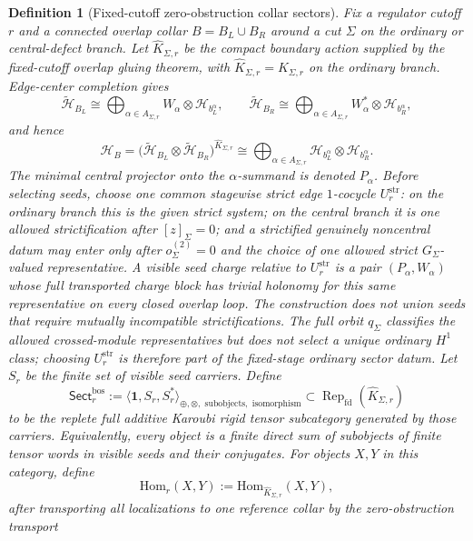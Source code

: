 \documentclass[11pt]{article}
\newtheorem{definition}[theorem]{Definition}
\begin{document}
\begin{definition}[Fixed-cutoff zero-obstruction collar sectors]\label{def:fixed-cutoff-collar-sectors}
Fix a regulator cutoff \(r\) and a connected overlap collar \(B=B_L\cup B_R\) around a cut
\(\Sigma\) on the ordinary or central-defect branch. Let \(\widehat K_{\Sigma,r}\) be the compact
boundary action supplied by the fixed-cutoff overlap gluing theorem, with
\(\widehat K_{\Sigma,r}=K_{\Sigma,r}\) on the ordinary branch. Edge-center completion gives
\[
\widetilde{\mathcal H}_{B_L}
\cong
\bigoplus_{\alpha\in A_{\Sigma,r}}
W_\alpha\otimes \mathcal H_{b_L^\alpha},
\qquad
\widetilde{\mathcal H}_{B_R}
\cong
\bigoplus_{\alpha\in A_{\Sigma,r}}
W_\alpha^*\otimes \mathcal H_{b_R^\alpha},
\]
and hence
\[
\mathcal H_B
=
\bigl(\widetilde{\mathcal H}_{B_L}\otimes\widetilde{\mathcal H}_{B_R}\bigr)^{\widehat K_{\Sigma,r}}
\cong
\bigoplus_{\alpha\in A_{\Sigma,r}}
\mathcal H_{b_L^\alpha}\otimes \mathcal H_{b_R^\alpha}.
\]
The minimal central projector onto the \(\alpha\)-summand is denoted \(P_\alpha\). Before selecting
seeds, choose one common stagewise strict edge \(1\)-cocycle
\(U^{\mathrm{str}}_r\): on the ordinary branch this is the given strict system; on the central
branch it is one allowed strictification after \([z]_\Sigma=0\); and a strictified genuinely
noncentral datum may enter only after \(o^{(2)}_\Sigma=0\) and the choice of one allowed strict
\(G_\Sigma\)-valued representative. A \emph{visible seed charge relative to
\(U^{\mathrm{str}}_r\)} is a pair \((P_\alpha,W_\alpha)\) whose full transported charge block has
trivial holonomy for this same representative on every closed overlap loop. The construction does
not union seeds that require mutually incompatible strictifications. The full orbit \(q_\Sigma\)
classifies the allowed crossed-module representatives but does not select a unique ordinary
\(H^1\) class; choosing \(U^{\mathrm{str}}_r\) is therefore part of the fixed-stage ordinary
sector datum.
Let \(S_r\) be the finite set of visible seed carriers. Define
\[
\mathsf{Sect}^{\mathrm{bos}}_r
:=
\bigl\langle \mathbf 1,S_r,S_r^*\bigr\rangle_{\oplus,\otimes,
\text{ subobjects},\text{ isomorphism}}
\subset \operatorname{Rep}_{\mathrm{fd}}(\widehat K_{\Sigma,r})
\]
to be the replete full additive Karoubi rigid tensor subcategory generated by those carriers.
Equivalently, every object is a finite direct sum of subobjects of finite tensor words in visible
seeds and their conjugates. For objects \(X,Y\) in this category, define
\[
\mathrm{Hom}_r(X,Y):=\mathrm{Hom}_{\widehat K_{\Sigma,r}}(X,Y),
\]
after transporting all localizations to one reference collar by the zero-obstruction transport

\end{definition}
\end{document}
